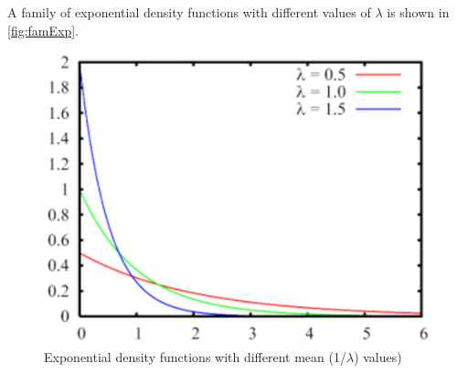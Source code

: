 A family of exponential density functions with different values of
$\lambda$ is shown in \autoref{fig:famExp}.
\begin{figure}[htb]
    \begin{center}
        \includegraphics[scale=.5]{img/jsimg/4.5.eps}
    \end{center}
    \caption{Exponential density functions with different mean (1/$\lambda$) values)}
    \label{fig:famExp}
\end{figure}\\


